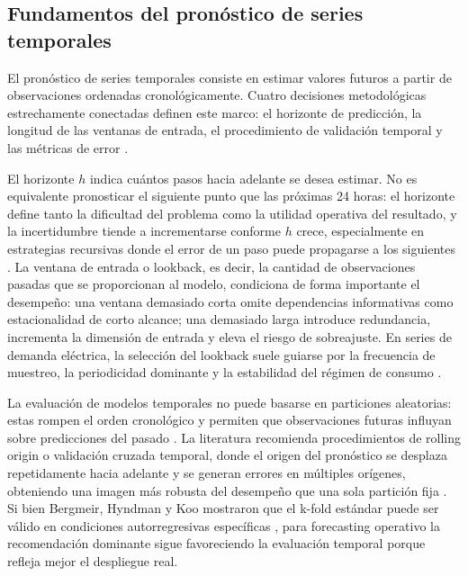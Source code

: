 \subsection{Fundamentos del pronóstico de series temporales}

El pronóstico de series temporales consiste en estimar valores futuros a partir de observaciones ordenadas cronológicamente. Cuatro decisiones metodológicas estrechamente conectadas definen este marco: el horizonte de predicción, la longitud de las ventanas de entrada, el procedimiento de validación temporal y las métricas de error \parencite{hyndman2021}.

El horizonte \(h\) indica cuántos pasos hacia adelante se desea estimar. No es equivalente pronosticar el siguiente punto que las próximas 24 horas: el horizonte define tanto la dificultad del problema como la utilidad operativa del resultado, y la incertidumbre tiende a incrementarse conforme \(h\) crece, especialmente en estrategias recursivas donde el error de un paso puede propagarse a los siguientes \parencite{tashman2000}. La ventana de entrada o lookback, es decir, la cantidad de observaciones pasadas que se proporcionan al modelo, condiciona de forma importante el desempeño: una ventana demasiado corta omite dependencias informativas como estacionalidad de corto alcance; una demasiado larga introduce redundancia, incrementa la dimensión de entrada y eleva el riesgo de sobreajuste. En series de demanda eléctrica, la selección del lookback suele guiarse por la frecuencia de muestreo, la periodicidad dominante y la estabilidad del régimen de consumo \parencite{hyndman2021,weron2006}.

La evaluación de modelos temporales no puede basarse en particiones aleatorias: estas rompen el orden cronológico y permiten que observaciones futuras influyan sobre predicciones del pasado \parencite{tashman2000}. La literatura recomienda procedimientos de rolling origin o validación cruzada temporal, donde el origen del pronóstico se desplaza repetidamente hacia adelante y se generan errores en múltiples orígenes, obteniendo una imagen más robusta del desempeño que una sola partición fija \parencite{hyndman2021}. Si bien Bergmeir, Hyndman y Koo mostraron que el k-fold estándar puede ser válido en condiciones autorregresivas específicas \parencite{bergmeir2018}, para forecasting operativo la recomendación dominante sigue favoreciendo la evaluación temporal porque refleja mejor el despliegue real.

